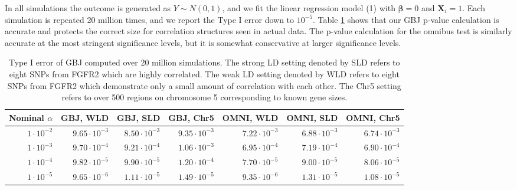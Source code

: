 \documentclass[12pt]{article}
\begin{document}
In all simulations the outcome is generated as $Y\sim N(0,1)$, and
we fit the linear regression model (1) with $\boldsymbol{\beta}=0$
and $\mathbf{X}_{i}=1$. 
Each simulation is repeated 20 million times, and we report the Type I error down to $10^{-5}$. 
Table \ref{p2_tab:typeIerr} shows that our GBJ p-value calculation is accurate and protects the correct size
for correlation structures seen in actual data. 
The p-value calculation for the omnibus test is similarly accurate at the most stringent significance levels, but it is
somewhat conservative at larger significance levels.


\begin{table}[ht]
\caption{Type I error of GBJ computed over 20 million simulations. The strong LD setting denoted by SLD refers to
eight SNPs from FGFR2 which are highly correlated.  The weak LD setting denoted by WLD refers to eight SNPs from FGFR2 which
demonstrate only a small amount of correlation with each other. The Chr5 setting refers to over 500 regions on chromosome 5 corresponding to known gene sizes.}
\small
\begin{center}
\begin{tabular}{rrrrrrr}
  \hline
Nominal $\alpha$ & GBJ, WLD & GBJ, SLD & GBJ, Chr5 & OMNI, WLD & OMNI, SLD & OMNI, Chr5 \\ 
  \hline
$1\cdot10^{-2}$ & $9.65\cdot10^{-3}$ & $8.50\cdot10^{-3}$ & $9.35\cdot10^{-3}$ & $7.22\cdot10^{-3}$ & $6.88\cdot10^{-3}$ & $6.74\cdot10^{-3}$ \\ 
  $1\cdot10^{-3}$ & $9.70\cdot10^{-4}$ & $9.21\cdot10^{-4}$ & $1.06\cdot10^{-3}$ & $6.95\cdot10^{-4}$ & $7.19\cdot10^{-4}$ & $6.90\cdot10^{-4}$ \\ 
  $1\cdot10^{-4}$ & $9.82\cdot10^{-5}$ & $9.90\cdot10^{-5}$ & $1.20\cdot10^{-4}$ & $7.70\cdot10^{-5}$ & $9.00\cdot10^{-5}$ & $8.06\cdot10^{-5}$ \\ 
  $1\cdot10^{-5}$ & $9.65\cdot10^{-6}$ & $1.11\cdot10^{-5}$ & $1.49\cdot10^{-5}$ & $9.35\cdot10^{-6}$ & $1.31\cdot10^{-5}$ & $1.08\cdot10^{-5}$ \\ 
   \hline
\end{tabular}
\end{center}
\label{p2_tab:typeIerr}
\end{table}

\end{document}
